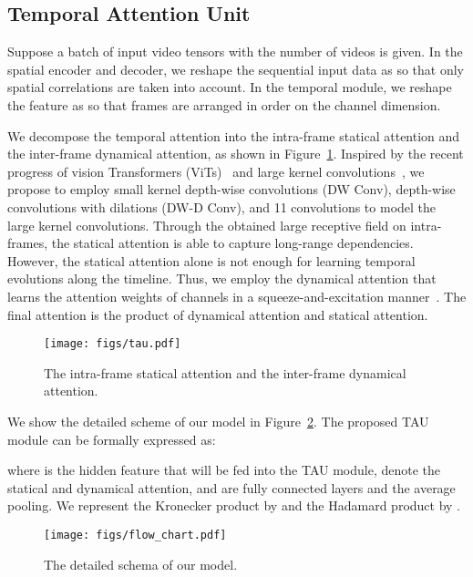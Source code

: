 \documentclass[10pt,twocolumn,letterpaper]{article}
\begin{document}
\subsection{Temporal Attention Unit}

Suppose a batch of input video tensors  with the number of videos  is given. In the spatial encoder and decoder, we reshape the sequential input data  as  so that only spatial correlations are taken into account. In the temporal module, we reshape the feature  as  so that frames are arranged in order on the channel dimension.

We decompose the temporal attention into the intra-frame statical attention and the inter-frame dynamical attention, as shown in Figure~\ref{fig:tau}. Inspired by the recent progress of vision Transformers (ViTs)~\cite{dosovitskiy2020image,liu2021swin} and large kernel convolutions~\cite{liu2022convnet,ding2022scaling,guo2022visual}, we propose to employ small kernel depth-wise convolutions (DW Conv), depth-wise convolutions with dilations (DW-D Conv), and 11 convolutions to model the large kernel convolutions. Through the obtained large receptive field on intra-frames, the statical attention is able to capture long-range dependencies. However, the statical attention alone is not enough for learning temporal evolutions along the timeline. Thus, we employ the dynamical attention that learns the attention weights of channels in a squeeze-and-excitation manner~\cite{hu2018squeeze}. The final attention is the product of dynamical attention and statical attention.

\begin{figure}[htbp]
\centering
\texttt{[image: figs/tau.pdf]} 
\caption{The intra-frame statical attention and the inter-frame dynamical attention.}
\label{fig:tau} 
\end{figure}

We show the detailed scheme of our model in Figure~\ref{fig:flow_chart}. The proposed TAU module can be formally expressed as:

where  is the hidden feature that will be fed into the TAU module,  denote the statical and dynamical attention,  and  are fully connected layers and the average pooling. We represent the Kronecker product by  and the Hadamard product by .

\begin{figure}[htbp]
\centering
\texttt{[image: figs/flow\_chart.pdf]} 
\caption{The detailed schema of our model.}
\label{fig:flow_chart} 
\end{figure}
\end{document}
